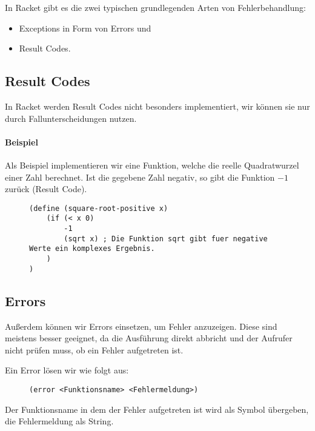 
In Racket gibt es die zwei typischen grundlegenden Arten von Fehlerbehandlung:
\begin{itemize}
	\item Exceptions in Form von Errors und
	\item Result Codes.
\end{itemize}

\subsection{Result Codes}
	
	In Racket werden Result Codes nicht besonders implementiert, wir können sie nur durch Fallunterscheidungen nutzen.
	
	\paragraph{Beispiel}
		Als Beispiel implementieren wir eine Funktion, welche die reelle Quadratwurzel einer Zahl berechnet. Ist die gegebene Zahl negativ, so gibt die Funktion \(-1\) zurück (Result Code).
		
		\begin{figure}[H]
			\centering
			\begin{lstlisting}[language = Racket]
(define (square-root-positive x)
	(if (< x 0)
		-1
		(sqrt x) ; Die Funktion sqrt gibt fuer negative Werte ein komplexes Ergebnis.
	)
)
\end{lstlisting}
		\end{figure}

\subsection{Errors}
	
	Außerdem können wir Errors einsetzen, um Fehler anzuzeigen. Diese sind meistens besser geeignet, da die Ausführung direkt abbricht und der Aufrufer nicht prüfen muss, ob ein Fehler aufgetreten ist.
	
	Ein Error lösen wir wie folgt aus:
	\begin{figure}[H]
		\centering
		\lstinline[language = Racket]|(error <Funktionsname> <Fehlermeldung>)|
	\end{figure}
	Der Funktionsname in dem der Fehler aufgetreten ist wird als Symbol übergeben, die Fehlermeldung als String.
	
